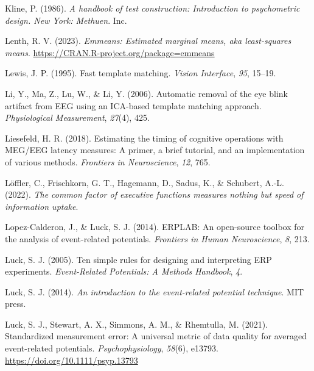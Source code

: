 \documentclass[
  man]{apa7}
\newlength{\cslhangindent}
\newlength{\cslentryspacingunit} %
\newenvironment{CSLReferences}[2] %
 {%
  \setlength{\parindent}{0pt}
  \ifodd #1
  \let\oldpar\par
  \def\par{\hangindent=\cslhangindent\oldpar}
  \fi
  \setlength{\parskip}{#2\cslentryspacingunit}
 }%
 {}
\begin{document}
\begin{CSLReferences}{1}{0}
\leavevmode{}%
Kline, P. (1986). \emph{A handbook of test construction: {Introduction} to psychometric design. {New} {York}: {Methuen}}. Inc.

\leavevmode{}%
Lenth, R. V. (2023). \emph{Emmeans: Estimated marginal means, aka least-squares means}. \url{https://CRAN.R-project.org/package=emmeans}

\leavevmode{}%
Lewis, J. P. (1995). Fast template matching. \emph{Vision Interface}, \emph{95}, 15--19.

\leavevmode{}%
Li, Y., Ma, Z., Lu, W., \& Li, Y. (2006). Automatic removal of the eye blink artifact from {EEG} using an {ICA}-based template matching approach. \emph{Physiological Measurement}, \emph{27}(4), 425.

\leavevmode{}%
Liesefeld, H. R. (2018). Estimating the timing of cognitive operations with {MEG}/{EEG} latency measures: A primer, a brief tutorial, and an implementation of various methods. \emph{Frontiers in Neuroscience}, \emph{12}, 765.

\leavevmode{}%
Löffler, C., Frischkorn, G. T., Hagemann, D., Sadus, K., \& Schubert, A.-L. (2022). \emph{The common factor of executive functions measures nothing but speed of information uptake}.

\leavevmode{}%
Lopez-Calderon, J., \& Luck, S. J. (2014). {ERPLAB}: An open-source toolbox for the analysis of event-related potentials. \emph{Frontiers in Human Neuroscience}, \emph{8}, 213.

\leavevmode{}%
Luck, S. J. (2005). Ten simple rules for designing and interpreting {ERP} experiments. \emph{Event-Related Potentials: A Methods Handbook}, \emph{4}.

\leavevmode{}%
Luck, S. J. (2014). \emph{An introduction to the event-related potential technique}. MIT press.

\leavevmode{}%
Luck, S. J., Stewart, A. X., Simmons, A. M., \& Rhemtulla, M. (2021). Standardized measurement error: {A} universal metric of data quality for averaged event-related potentials. \emph{Psychophysiology}, \emph{58}(6), e13793. \url{https://doi.org/10.1111/psyp.13793}


\end{CSLReferences}
\end{document}
